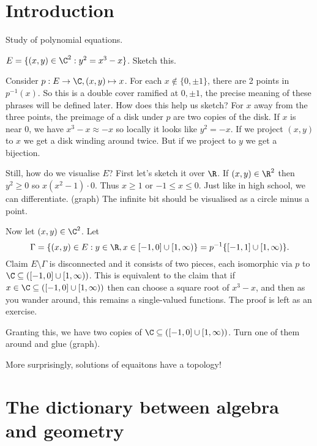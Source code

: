 \documentclass[a4paper]{article}
\begin{document}


\tableofcontents

\setcounter{section}{-1}

\section{Introduction}

Study of polynomial equations.

\begin{eg}
  \(E = \{(x, y) \in \C^2: y^2 = x^3 - x\}\). Sketch this.

  Consider \(p: E \to \C, (x, y) \mapsto x\). For each \(x \notin \{0, \pm 1\}\), there are 2 points in \(p^{-1}(x)\). So this is a double cover ramified at \(0, \pm 1\), the precise meaning of these phrases will be defined later. How does this help us sketch? For \(x\) away from the three points, the preimage of a disk under \(p\) are two copies of the disk. If \(x\) is near \(0\), we have \(x^3 - x \approx -x\) so locally it looks like \(y^2 = -x\). If we project \((x, y)\) to \(x\) we get a disk winding around twice. But if we project to \(y\) we get a bijection.

  Still, how do we visualise \(E\)? First let's sketch it over \(\R\). If \((x, y) \in \R^2\) then \(y^2 \geq 0\) so \(x(x^2 - 1) \cdot 0\). Thus \(x \geq 1\) or \(-1 \leq x \leq 0\). Just like in high school, we can differentiate. (graph) The infinite bit should be visualised as a circle minus a point.

  Now let \((x, y) \in \C^2\). Let
  \[
    \Gamma = \{(x, y) \in E: y \in \R, x \in [-1, 0] \cup [1, \infty)\} = p^{-1}\{[-1, 1] \cup [1, \infty)\}.
  \]
  Claim \(E \setminus \Gamma\) is disconnected and it consists of two pieces, each isomorphic via \(p\) to \(\C \subseteq ([-1, 0] \cup [1, \infty))\). This is equivalent to the claim that if \(x \in \C \subseteq ([-1, 0] \cup [1, \infty))\) then can choose a square root of \(x^3 - x\), and then as you wander around, this remains a single-valued functions. The proof is left as an exercise.

  Granting this, we have two copies of \(\C \subseteq ([-1, 0] \cup [1, \infty))\). Turn one of them around and glue (graph).

  More surprisingly, solutions of equaitons have a topology!
\end{eg}

\section{The dictionary between algebra and geometry}
\end{document}
